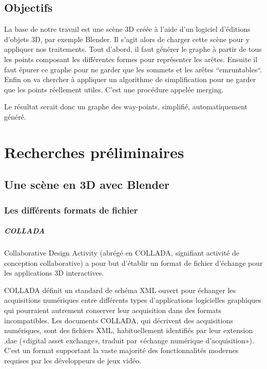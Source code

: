 \documentclass[a4paper,12pt]{report}
\begin{document}
\section*{Objectifs}

La base de notre travail est une scène 3D créée à l'aide d'un logiciel d'éditions d'objets 3D, par exemple Blender. Il s'agit alors de charger cette scène pour y appliquer nos traitements. Tout d'abord, il faut générer le graphe à partir de tous les points composant les différentes formes pour représenter les arêtes. Ensuite il faut épurer ce graphe pour ne garder que les sommets et les arêtes ``emruntables``. Enfin on va chercher à appliquer un algorithme de simplification pour ne garder que les points réellement utiles. C'est une procédure appelée merging.

Le résultat serait donc un graphe des way-points, simplifié, automatiquement généré.

\newpage

\chapter{Recherches préliminaires}

\section{Une scène en 3D avec Blender}

\subsection{Les différents formats de fichier}

\paragraph{COLLADA}

Collaborative Design Activity (abrégé en COLLADA, signifiant activité de conception collaborative) a pour but d'établir un format de fichier d'échange pour les applications 3D interactives.

COLLADA définit un standard de schéma XML ouvert pour échanger les acquisitions numériques entre différents types d'applications logicielles graphiques qui pourraient autrement conserver leur acquisition dans des formats incompatibles. Les documents COLLADA, qui décrivent des acquisitions numériques, sont des fichiers XML, habituellement identifiés par leur extension .dae («digital asset exchange», traduit par «échange numérique d'acquisition»).
C'est un format supportant la vaste majorité des fonctionnalités modernes
requises par les développeurs de jeux vidéo. 
\end{document}

